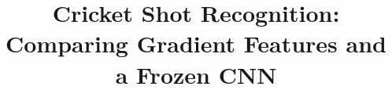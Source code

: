 \documentclass[10pt,twocolumn,letterpaper]{article}
\begin{document}
\title{Cricket Shot Recognition:\\Comparing Gradient Features and a Frozen CNN}

\maketitle

{\small}
\clearpage\appendix

\end{document}
